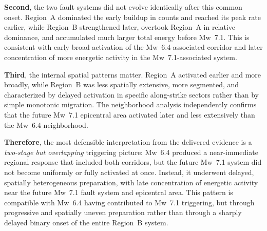 \documentclass[11pt]{article}
\begin{document}
\textbf{Second}, the two fault systems did not evolve identically after this common onset. Region~A dominated the early buildup in counts and reached its peak rate earlier, while Region~B strengthened later, overtook Region~A in relative dominance, and accumulated much larger total energy before Mw~7.1. This is consistent with early broad activation of the Mw~6.4-associated corridor and later concentration of more energetic activity in the Mw~7.1-associated system.

\textbf{Third}, the internal spatial patterns matter. Region~A activated earlier and more broadly, while Region~B was less spatially extensive, more segmented, and characterized by delayed activation in specific along-strike sectors rather than by simple monotonic migration. The neighborhood analysis independently confirms that the future Mw~7.1 epicentral area activated later and less extensively than the Mw~6.4 neighborhood.

\textbf{Therefore}, the most defensible interpretation from the delivered evidence is a \emph{two-stage but overlapping} triggering picture: Mw~6.4 produced a near-immediate regional response that included both corridors, but the future Mw~7.1 system did not become uniformly or fully activated at once. Instead, it underwent delayed, spatially heterogeneous preparation, with late concentration of energetic activity near the future Mw~7.1 fault system and epicentral area. This pattern is compatible with Mw~6.4 having contributed to Mw~7.1 triggering, but through progressive and spatially uneven preparation rather than through a sharply delayed binary onset of the entire Region~B system.
\end{document}
